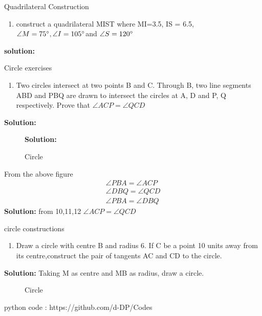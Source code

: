 \documentclass{beamer}
\newcounter{saveenumi}
\newcommand{\seti}{\setcounter{saveenumi}{\value{enumi}}}
\newcommand{\conti}{\setcounter{enumi}{\value{saveenumi}}}
\begin{document}
\begin{frame}{Quadrilateral Construction}
\begin{enumerate}
\conti
\item construct a quadrilateral MIST where MI=3.5, IS = 6.5, $\angle{M} = 75\degree , \angle{I} = 105\degree $and $\angle{S} =120\degree$
\seti
\end{enumerate}
\textbf{solution:}
\end{frame}
\begin{frame}{Circle exercises}
\begin{enumerate}
\conti
\item Two circles intersect at two points B and C.
Through B, two line segments ABD and PBQ
are drawn to intersect the circles at A, D and
P, Q respectively. Prove that $\angle{ACP}=\angle{QCD}$
\seti
\end{enumerate}
\textbf{Solution:}
\begin{figure}[!ht]
\resizebox{0.2\linewidth}{!}
{

}
\caption{Circle}
\label{fig:foo}\textbf{Solution:} 
\end{figure}
From the above figure
\begin{align}
\angle{PBA}=\angle{ACP}\\
\angle{DBQ}=\angle{QCD}\\
\angle{PBA}=\angle{DBQ}
\end{align}\textbf{Solution:} 
from 10,11,12 $\angle{ACP}=\angle{QCD}$
\end{frame}
\begin{frame}{circle constructions}
\begin{enumerate}
\conti 
\item Draw a circle with centre B and radius 6. If C be a point 10 units away from its centre,construct the pair of tangents AC and CD to
the circle.
\seti
\end{enumerate}
\textbf{Solution:} Taking M as centre and MB as radius, draw a circle. 
\begin{figure}[!ht]
\resizebox{0.35\linewidth}{!}
{

}
\caption{Circle}
\label{fig:foo}
\end{figure}
python code : https://github.com/d-DP/Codes
\end{frame}
\end{document}
